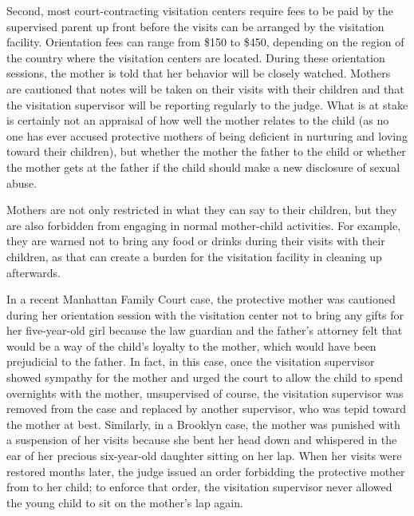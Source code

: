 Second, most court-contracting visitation centers require  fees to be paid by the supervised parent up front before the
visits can be arranged by the visitation facility. Orientation fees can
range from \$150 to \$450, depending on the region of the
country where the visitation centers are located. During these orientation sessions, the mother is told that her behavior will be closely
watched. Mothers are cautioned that notes will be taken on their visits
with their children and that the visitation supervisor 
will be reporting regularly to the judge. What
is at stake is certainly not an appraisal of how well the mother relates
to the child (as no one has ever accused protective mothers of being
deficient in nurturing and loving toward their children), but whether the 
mother  the father to the child or whether 
the mother gets  at the father if the child should make a new disclosure of sexual
abuse. \pfl{}

\vspace{2.5em}


\noindent{}Mothers are not only restricted in what they can say to their children,
but they are also forbidden from engaging in normal mother-child 
activities. For example, they are warned not to bring any food or drinks
during their visits with their children, as that can create a burden for the
visitation facility in cleaning up afterwards. \pfl{}

In a recent Manhattan Family Court case, the protective mother was
cautioned during her orientation session with the visitation center not
to bring any gifts for her five-year-old girl because the law guardian
and the father's attorney felt that would be a way of  the
child's loyalty to the mother, which would have been prejudicial to the
father. In fact, in this case, once the visitation supervisor showed sympathy for the mother and urged the court to allow the child to spend
overnights with the mother, unsupervised of course, the visitation supervisor was removed from the case and replaced by another supervisor,
who was tepid toward the mother at best. Similarly, in a Brooklyn case,
the mother was punished with a suspension of her visits because she bent
her head down and whispered  in the ear of her precious
six-year-old daughter sitting on her lap. When her visits were restored months later, the judge issued an order forbidding the protective
mother from  to her child; to enforce that order, 
the visitation supervisor 
never allowed the young child to sit on the mother's lap
again. \pfl{}

